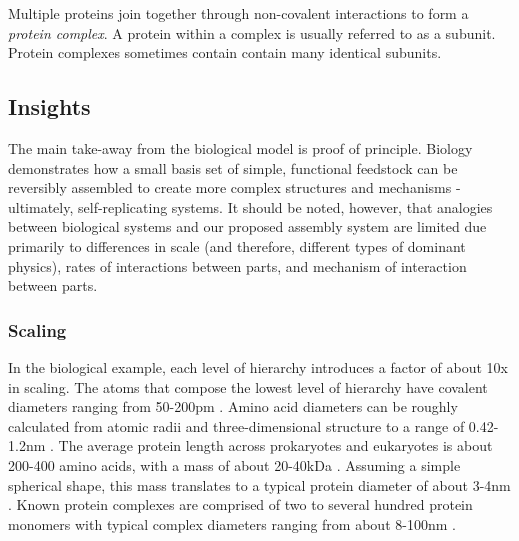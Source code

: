 {Multiple proteins join together through non-covalent interactions to form a \textit{protein complex}.  A protein within a complex is usually referred to as a subunit.  Protein complexes sometimes contain contain many identical subunits.

\subsection{Insights}

The main take-away from the biological model is proof of principle.  Biology demonstrates how a small basis set of simple, functional feedstock can be reversibly assembled to create more complex structures and mechanisms - ultimately, self-replicating systems.  It should be noted, however, that analogies between biological systems and our proposed assembly system are limited due primarily to differences in scale (and therefore, different types of dominant physics), rates of interactions between parts, and mechanism of interaction between parts.

\subsubsection{Scaling}

In the biological example, each level of hierarchy introduces a factor of about 10x in scaling.  The atoms that compose the lowest level of hierarchy have covalent diameters ranging from 50-200pm  \cite{Slater1993}.  Amino acid diameters can be roughly calculated from atomic radii and three-dimensional structure to a range of 0.42-1.2nm  \cite{Pool2003}.  The average protein length across prokaryotes and eukaryotes is about 200-400 amino acids, with a mass of about 20-40kDa  \cite{Brocchieri2005}.  Assuming a simple spherical shape, this mass translates to a typical protein diameter of about 3-4nm  \cite{Erickson2009}.  Known protein complexes are comprised of two to several hundred protein monomers with typical complex diameters ranging from about 8-100nm  \cite{Yang2010a}.

%

}
